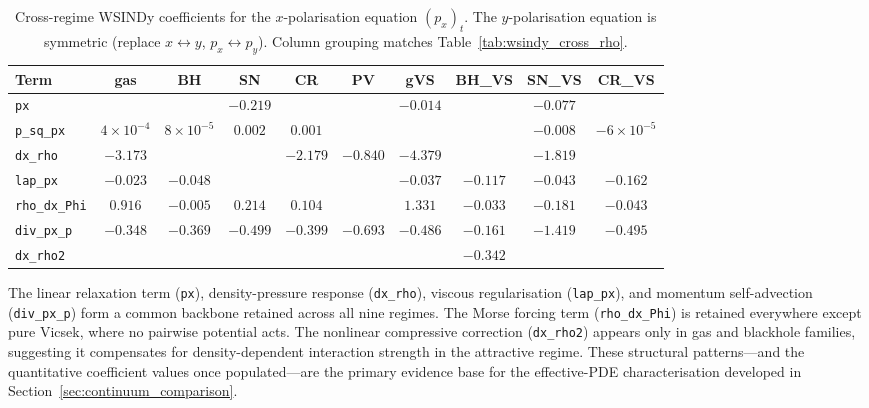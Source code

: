 \begin{table}[ht]
\centering\small
\caption{Cross-regime WSINDy coefficients for the $x$-polarisation equation
$(p_x)_t$.  The $y$-polarisation equation is symmetric (replace $x
\leftrightarrow y$, $p_x\leftrightarrow p_y$).  Column grouping matches
Table~\ref{tab:wsindy_cross_rho}.}
\label{tab:wsindy_cross_px}
\begin{tabular}{l ccccc|cccc}
\toprule
\textbf{Term} & \textbf{gas} & \textbf{BH} & \textbf{SN} & \textbf{CR} & \textbf{PV} & \textbf{gVS} & \textbf{BH\_VS} & \textbf{SN\_VS} & \textbf{CR\_VS} \\
\midrule
\texttt{px}             &              &              & $-0.219$     &  &              & $-0.014$ &              & $-0.077$ &  \\
\texttt{p\_sq\_px}      & $4{\times}10^{-4}$ & $8{\times}10^{-5}$ & $0.002$ & $0.001$ &     &  &              & $-0.008$ & $-6{\times}10^{-5}$ \\
\texttt{dx\_rho}        & $-3.173$ &              &              & $-2.179$ & $-0.840$ & $-4.379$ &              & $-1.819$ &  \\
\texttt{lap\_px}        & $-0.023$ & $-0.048$ &              &  &          & $-0.037$ & $-0.117$     & $-0.043$ & $-0.162$ \\
\texttt{rho\_dx\_Phi}   & $0.916$  & $-0.005$ & $0.214$      & $0.104$ &          & $1.331$ & $-0.033$     & $-0.181$ & $-0.043$ \\
\texttt{div\_px\_p}     & $-0.348$ & $-0.369$ & $-0.499$     & $-0.399$ & $-0.693$ & $-0.486$ & $-0.161$     & $-1.419$ & $-0.495$ \\
\texttt{dx\_rho2}       &          &          &              &  &          &          & $-0.342$     &          &          \\
\bottomrule
\end{tabular}
\end{table}

The linear relaxation term (\texttt{px}), density-pressure response
(\texttt{dx\_rho}), viscous regularisation (\texttt{lap\_px}), and
momentum self-advection (\texttt{div\_px\_p}) form a common backbone
retained across all nine regimes.  The Morse forcing term
(\texttt{rho\_dx\_Phi}) is retained everywhere except pure Vicsek, where
no pairwise potential acts.  The nonlinear compressive correction
(\texttt{dx\_rho2}) appears only in gas and blackhole families,
suggesting it compensates for density-dependent interaction strength in
the attractive regime.  These structural patterns---and the quantitative
coefficient values once populated---are the primary evidence base for the
effective-PDE characterisation developed in
Section~\ref{sec:continuum_comparison}.

